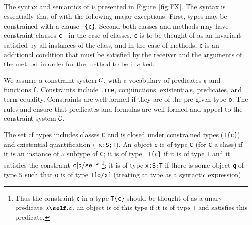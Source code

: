 \subsection{\FXZ{}}

The syntax and semantics of \FXZ{} is presented in Figure~\ref{fig:FX}. 
%
The syntax is essentially that of \FJ{} with the following major
exceptions. First, types may be constrained with a clause {\tt
\{c\}}. Second both classes and methods may have constraint clauses
{\tt c}---in the case of classes, {\tt c} is to be thought of as an
invariant satisfied by all instances of the class, and in the case of
methods, {\tt c} is an additional condition that must be satisfied by
the receiver and the arguments of the method in order for the method to
be invoked.

We assume a constraint system $\cal C$, with a vocabulary of
predicates {\tt q} and functions {\tt f}.
Constraints include {\tt true}, conjunctions, existentials,
predicates, and term equality.
Constraints are well-formed if they are of the pre-given
type {\tt o}.
The rules  and 
ensure that predicates and formulas are well-formed and appeal
to the constraint system $\cal C$.


The set of types includes classes {\tt C} and is closed under
constrained types ({\tt T\{c\}}) and existential quantification ({\tt
x:S;T}). An object {\tt o} is of type {\tt C} (for {\tt C} a class)
if it is an instance of a subtype of {\tt C}; it is of type {\tt
T\{c\}} if it is of type {\tt T} and it satisfies the constraint $\tt
c[o/self]$\footnote{Thus the constraint {\tt c} in a type {\tt T\{c\}}
should be thought of as a unary predicate $\lambda\self.{\tt c}$, an
object is of this type if it is of type {\tt T} and satisfies this
predicate.}; it is of type {\tt x:S;T} if there is some object {\tt q}
of type {\tt S} such that {\tt o} is of type {\tt T[q/x]} (treating at
type as a syntactic expression).

